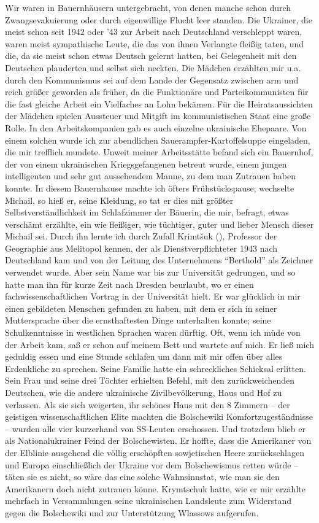  Wir waren in Bauernhäusern untergebracht, von denen manche schon durch Zwangsevakuierung oder durch eigenwillige Flucht leer standen. Die Ukrainer, die meist schon seit 1942 oder '43 zur Arbeit nach Deutschland verschleppt waren, waren meist sympathische Leute, die das von ihnen Verlangte fleißig taten, und die, da sie meist schon etwas Deutsch gelernt hatten, bei Gelegenheit mit den Deutschen plauderten und selbst sich neckten. Die Mädchen erzählten mir u.a. durch den Kommunismus sei auf dem Lande der Gegensatz zwischen arm und reich größer geworden als früher, da die Funktionäre und Parteikommunisten für die fast gleiche Arbeit ein Vielfaches an Lohn bekämen. Für die Heiratsaussichten der Mädchen spielen Aussteuer und Mitgift im kommunistischen Staat eine große Rolle. In den Arbeitskompanien gab es auch einzelne ukrainische Ehepaare. Von einem solchen wurde ich zur abendlichen Sauerampfer-Kartoffelsuppe eingeladen, die mir trefflich mundete. Unweit meiner Arbeitsstätte befand sich ein Bauernhof, der von einem ukrainischen Kriegsgefangenen betreut wurde, einem  jungen intelligenten und sehr gut aussehendem Manne, zu dem man Zutrauen haben konnte. In diesem Bauernhause machte ich öfters Frühstückspause; wechselte Michail, so hieß er, seine Kleidung, so tat er dies mit größter Selbstverständlichkeit im Schlafzimmer der Bäuerin, die mir, befragt, etwas verschämt erzählte, ein wie fleißiger, wie tüchtiger, guter und lieber Mensch dieser Michail sei. Durch ihn lernte ich durch Zufall Krimtšuk (), Professor der Geographie aus Melitopol kennen, der als Dienstverpflichteter 1943 nach Deutschland kam und von der Leitung des Unternehmens \enquote{Berthold} als Zeichner verwendet wurde. Aber sein Name war bis zur Universität gedrungen, und so hatte man ihn für kurze Zeit nach Dresden beurlaubt, wo er einen fachwissenschaftlichen Vortrag in der Universität hielt. Er war glücklich in mir einen gebildeten Menschen gefunden zu haben, mit dem er sich in seiner Muttersprache über die ernsthaftesten Dinge unterhalten konnte; seine Schulkenntnisse in westlichen Sprachen waren dürftig. Oft, wenn ich müde von der Arbeit kam, saß er schon auf meinem Bett und wartete auf mich. Er ließ mich geduldig essen und eine Stunde schlafen um dann mit mir offen über alles Erdenkliche zu sprechen. Seine Familie hatte ein schreckliches Schicksal erlitten. Sein  Frau und seine drei Töchter erhielten Befehl, mit den zurückweichenden Deutschen, wie die andere ukrainische Zivilbevölkerung, Haus und Hof zu verlassen. Als sie sich weigerten, ihr schönes Haus mit den 8 Zimmern -- der geistigen wissenschaftlichen Elite machten die Bolschewiki Komfortzugeständnisse -- wurden alle vier kurzerhand von SS-Leuten erschossen. Und trotzdem blieb er als Nationalukrainer Feind der Bolschewisten. Er hoffte, dass die Amerikaner von der Elblinie ausgehend die völlig erschöpften sowjetischen Heere zurückschlagen und Europa einschließlich der Ukraine vor dem Bolschewismus retten würde -- täten sie es nicht, so wäre das eine solche Wahnsinnstat, wie man sie den Amerikanern doch nicht zutrauen könne. Krymtschuk hatte, wie er mir erzählte mehrfach in Versammlungen seine ukrainischen Landsleute zum Widerstand gegen die Bolschewiki und zur Unterstützung Wlassows aufgerufen.

